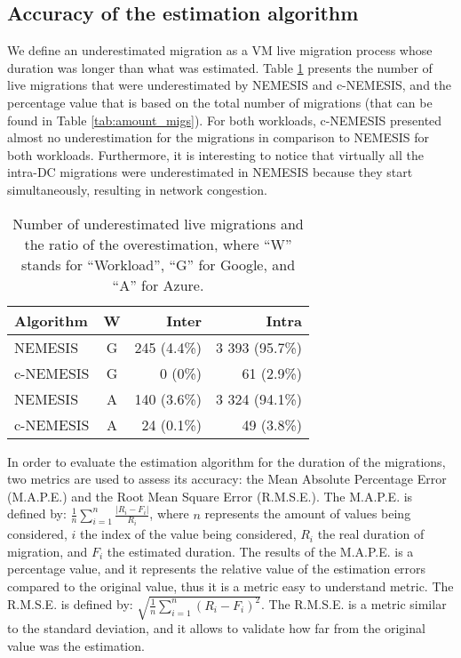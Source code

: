  \subsection{Accuracy of the estimation algorithm}
 
We define an underestimated migration as a VM live migration process whose duration was longer than what was estimated. Table \ref{tab:migs_under} presents the number of live migrations that were underestimated by NEMESIS and c-NEMESIS, and the percentage value that is based on the total number of migrations (that can be found in Table \ref{tab:amount_migs}). For both workloads, c-NEMESIS presented almost no underestimation for the migrations in comparison to NEMESIS for both workloads. Furthermore, it is interesting to notice that virtually all the intra-DC migrations were underestimated in NEMESIS because they start simultaneously, resulting in network congestion.

\begin{table}[!ht]
\caption{Number of underestimated live migrations and the ratio of the overestimation, where ``W'' stands for ``Workload'', ``G'' for Google, and ``A'' for Azure.}\label{tab:migs_under} \centering
\begin{tabular}{|l|c|r|r|}
  \hline
  \textbf{Algorithm} & \textbf{W}  & \textbf{Inter} & \textbf{Intra}   \\
  \hline
  NEMESIS  & G & 245 (4.4\%)   & 3 393 (95.7\%) \\
  \hline
  c-NEMESIS & G & 0 (0\%)  & 61 (2.9\%) \\
  \hline
  NEMESIS & A & 140 (3.6\%)   &  3 324 (94.1\%)   \\
  \hline
  c-NEMESIS & A & 24 (0.1\%)   & 49 (3.8\%) \\
  \hline  
\end{tabular}
\end{table}


In order to evaluate the estimation algorithm for the duration of the migrations, two metrics are used to assess its accuracy: the Mean Absolute Percentage Error (M.A.P.E.) and the Root Mean Square Error (R.M.S.E.). The M.A.P.E. is defined by: $ \frac{1}{n}\sum_{i=1}^{n}  \frac{| R_{i} - F_{i}|}{R_{i}}$, where $n$ represents the amount of values being considered, $i$ the index of the value being considered, $R_{i}$ the real duration of migration, and $F_{i}$ the estimated duration. The results of the M.A.P.E. is a percentage value, and it represents the relative value of the estimation errors compared to the original value, thus it is a metric easy to understand metric. The R.M.S.E. is defined by: $\sqrt{ \frac{1}{n}\sum_{i=1}^{n}  (R_{i} - F_{i})^2}$. The R.M.S.E. is a metric similar to the standard deviation, and it allows to validate how far from the original value was the estimation.


